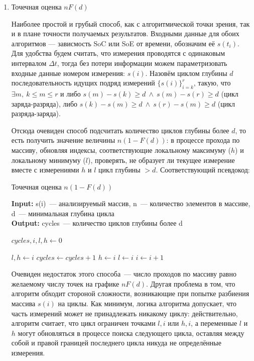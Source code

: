\documentclass{report}
\begin{document}
\begin{enumerate}
\item Точечная оценка $nF(d)$

Наиболее простой и грубый способ, как с алгоритмической точки зрения, так и в плане точности получаемых результатов.
Входными данные для обоих алгоритмов --- зависмость SoC или SoE от времени, обозначим её $s(t_i)$.
Для удобства будем считать, что измерения проводятся с одинаковым интервалом $\Delta t$, тогда без потери информации можем параметризовать входные данные номером измерения: $s(i)$.
Назовём циклом глубины $d$ последовательность идущих подряд измерений $\{s(i)\}_{i=k}^{r}$, такую, что 
$\exists m,~ k \leq m \leq r$ 
и либо $s(m) - s(k) \geq d ~\wedge~ s(m) - s(r) \geq d$ (цикл заряда-разряда), либо
 $s(k) - s(m) \geq d ~\wedge~ s(r) - s(m) \geq d$ (цикл разряда-заряда).
 
Отсюда очевиден способ подсчитать количество циклов глубины более $d$, то есть получить значение величины $n(1 - F(d))$: в процессе прохода по массиву, обновляя индексы, соответствующие локальному максимуму ($h$) и локальному минимуму ($l$), проверять, не образует ли текущее измерение вместе с измерениями $h$ и $l$ цикл глубины $ > d$.
Соответствующий псевдокод:

\begin{algorithm}
\caption{Точечная оценка $n(1 - F(d))$}\label{alg:simple-cycle}
\hspace*{\algorithmicindent} \textbf{Input:} s(i)~--- анализируемый массив, n~--- количество элементов в массиве, d~--- минимальная глубина цикла \\
\hspace*{\algorithmicindent} \textbf{Output:} cycles~--- количество циклов глубины более d 

\begin{algorithmic}[1]
\State $cycles, i, l, h \gets 0$


    \State $l,h \gets i$
    \State $cycles \gets cycles +1$
\Else
        \State $h \gets i$
    \EndIf
        \State $l \gets i$
    \EndIf
\EndIf
\State $i \gets i+1$
\EndWhile
 
\end{algorithmic}
\end{algorithm}

Очевиден недостаток этого способа~--- число проходов по массиву равно желаемому числу точек на графике $nF(d)$.
Другая проблема в том, что алгоритм обходит стороной сложности, возникающие при попытке разбиения массива $s(i)$ на циклы.
Как минимум, логика алгоритма допускает, что часть измерений может не принадлежать никакому циклу: действительно, алгоритм считает, что цикл ограничен точками $l, i$ или $h, i$, а переменные $l$ и $h$ могут обновляться в процессе поиска следующего цикла, оставляя между собой и правой границей последнего цикла никуда не определённые измерения.


\end{enumerate}
\end{document}
